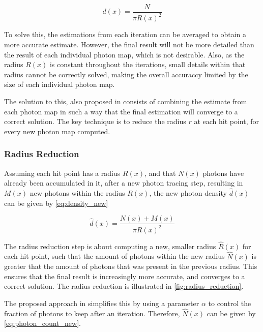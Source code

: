 \documentclass[main.tex]{subfiles}
\begin{document}
\begin{figure}[!htp]
  \begin{equation}
    d(x) = \frac{N}{\pi R(x)^{2}}
  \label{eq:density}
  \end{equation}
\end{figure}

To solve this, the estimations from each iteration can be averaged to obtain a more accurate estimate. However, the final result will not be more detailed than the result of each individual photon map, which is not desirable. Also, as the radius $R(x)$ is constant throughout the iterations, small details within that radius cannot be correctly solved, making the overall accuraccy limited by the size of each individual photon map.

The solution to this, also proposed in \cite{hachisuka2008progressive} consists of combining the estimate from each photon map in such a way that the final estimation will converge to a correct solution. The key technique is to reduce the radius $r$ at each hit point, for every new photon map computed.

\subsubsection{Radius Reduction}

Assuming each hit point has a radius $R(x)$, and that $N(x)$ photons have already been accumulated in it, after a new photon tracing step, resulting in $M(x)$ new photons within the radius $R(x)$, the new photon density $\hat{d}(x)$ can be given by \cref{eq:density_new}

\begin{figure}[!htp]
  \begin{equation}
    \hat{d}(x) = \frac{N(x) + M(x)}{\pi R(x)^{2}}
  \label{eq:density_new}
  \end{equation}
\end{figure}

The radius reduction step is about computing a new, smaller radius $\hat{R}(x)$ for each hit point, such that the amount of photons within the new radius $\hat{N}(x)$ is greater that the amount of photons that was present in the previous radius. This ensures that the final result is increasingly more accurate, and converges to a correct solution. The radius reduction is illustrated in \cref{fig:radius_reduction}.

The proposed approach in \cite{hachisuka2008progressive} simplifies this by using a parameter $\alpha$ to control the fraction of photons to keep after an iteration. Therefore, $\hat{N}(x)$ can be given by \cref{eq:photon_count_new}.
\end{document}
